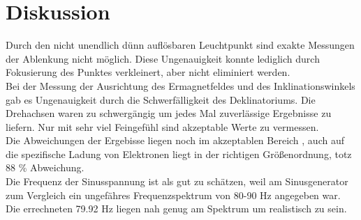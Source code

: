 \section{Diskussion}
\label{sec:Diskussion}

Durch den nicht unendlich dünn auflösbaren Leuchtpunkt sind exakte Messungen der Ablenkung nicht möglich.
Diese Ungenauigkeit konnte lediglich durch Fokusierung des Punktes verkleinert, aber nicht eliminiert werden. \\
\noindent 
Bei der Messung der Ausrichtung des Ermagnetfeldes und des Inklinationswinkels gab es Ungenauigkeit durch die Schwerfälligkeit des Deklinatoriums.
Die Drehachsen waren zu schwergängig um jedes Mal zuverlässige Ergebnisse zu liefern.
Nur mit sehr viel Feingefühl sind akzeptable Werte zu vermessen. \\
\noindent 
Die Abweichungen der Ergebisse liegen noch im akzeptablen Bereich , auch auf die spezifische Ladung von Elektronen liegt in der richtigen Größenordnung, totz 88 \% Abweichung. \\
\noindent 
Die Frequenz der Sinusspannung ist als gut zu schätzen, weil am Sinusgenerator zum Vergleich ein ungefähres Frequenzspektrum von 80-90 Hz angegeben war.
Die errechneten 79.92 Hz liegen nah genug am Spektrum um realistisch zu sein.